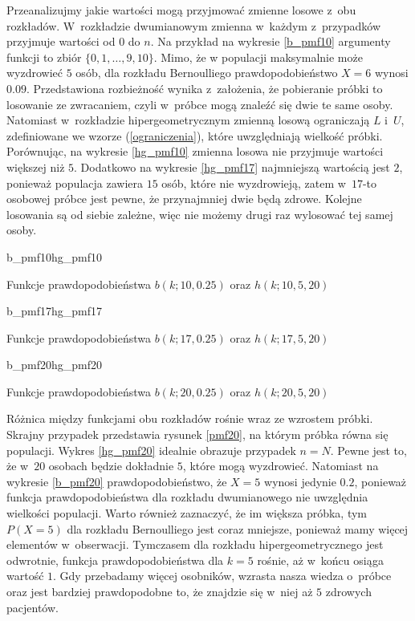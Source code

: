 Przeanalizujmy jakie wartości mogą przyjmować zmienne losowe z~obu rozkładów. W~rozkładzie dwumianowym zmienna w~każdym z~przypadków przyjmuje wartości od $0$ do $n$. Na przykład na wykresie \ref{b_pmf10} argumenty funkcji to zbiór $\{0,1,\ldots,9,10\}$. 
Mimo, że w populacji maksymalnie może wyzdrowieć $5$ osób, dla rozkładu Bernoulliego prawdopodobieństwo $X=6$ wynosi $0.09$. Przedstawiona rozbieżność wynika z~założenia, że pobieranie próbki to losowanie ze zwracaniem, czyli w~próbce mogą znaleźć się dwie te same osoby. Natomiast w~rozkładzie hipergeometrycznym zmienną losową ograniczają $L$ i~$U$, zdefiniowane we wzorze (\ref{ograniczenia}), które uwzględniają wielkość próbki. Porównując, na wykresie \ref{hg_pmf10} zmienna losowa nie przyjmuje wartości większej niż $5$. Dodatkowo na wykresie \ref{hg_pmf17} najmniejszą wartością jest $2$, ponieważ populacja zawiera $15$ osób, które nie wyzdrowieją, zatem w~$17$-to osobowej próbce jest pewne, że przynajmniej dwie będą zdrowe. Kolejne losowania są od siebie zależne, więc nie możemy drugi raz wylosować tej samej osoby.

\begin{diagrams}{b_pmf10}{hg_pmf10}
	\caption{Funkcje prawdopodobieństwa $b(k;10,0.25)$ oraz $h(k;10,5,20)$}
	\label{pmf10}
\end{diagrams}

\begin{diagrams}{b_pmf17}{hg_pmf17}
	\caption{Funkcje prawdopodobieństwa $b(k;17,0.25)$ oraz $h(k;17,5,20)$}
	\label{pmf17}
\end{diagrams}

\begin{diagrams}{b_pmf20}{hg_pmf20}
	\caption{Funkcje prawdopodobieństwa $b(k;20,0.25)$ oraz $h(k;20,5,20)$}
	\label{pmf20}
\end{diagrams}

Różnica między funkcjami obu rozkładów rośnie wraz ze wzrostem próbki. Skrajny przypadek przedstawia rysunek \ref{pmf20}, na którym próbka równa się populacji. Wykres \ref{hg_pmf20} idealnie obrazuje przypadek $n=N$. Pewne jest to, że w~$20$ osobach będzie dokładnie $5$, które mogą wyzdrowieć. Natomiast na wykresie \ref{b_pmf20} prawdopodobieństwo, że $X=5$ wynosi jedynie $0.2$, ponieważ funkcja prawdopodobieństwa dla rozkładu dwumianowego nie uwzględnia wielkości populacji. Warto również zaznaczyć, że im większa próbka, tym $P(X=5)$ dla rozkładu Bernoulliego jest coraz mniejsze, ponieważ mamy więcej elementów w~obserwacji. Tymczasem dla rozkładu hipergeometrycznego jest odwrotnie, funkcja prawdopodobieństwa dla $k=5$ rośnie, aż w~końcu osiąga wartość $1$. Gdy przebadamy więcej osobników, wzrasta nasza wiedza o~próbce oraz jest bardziej prawdopodobne to, że znajdzie się w~niej aż $5$ zdrowych pacjentów.

